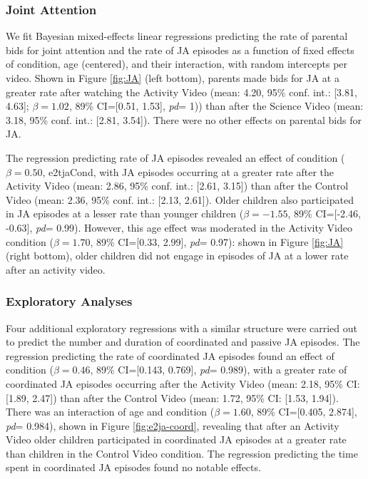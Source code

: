 \documentclass[man,floatsintext]{apa6}
\begin{document}
\hypertarget{joint-attention-1}{%
\subsubsection{Joint Attention}\label{joint-attention-1}}

We fit Bayesian mixed-effects linear regressions predicting the rate of parental bids for joint attention and the rate of JA episodes as a function of fixed effects of condition, age (centered), and their interaction, with random intercepts per video.
Shown in Figure \ref{fig:JA} (left bottom), parents made bids for JA at a greater rate after watching the Activity Video (mean: 4.20, 95\% conf. int.: {[}3.81, 4.63{]}; \(\beta=1.02\), 89\% CI={[}0.51, 1.53{]}, \emph{pd}= 1)) than after the Science Video (mean: 3.18, 95\% conf. int.: {[}2.81, 3.54{]}).
There were no other effects on parental bids for JA.

The regression predicting rate of JA episodes revealed an effect of condition (\(\beta=0.50\), e2tjaCond, with JA episodes occurring at a greater rate after the Activity Video (mean: 2.86, 95\% conf. int.: {[}2.61, 3.15{]}) than after the Control Video (mean: 2.36, 95\% conf. int.: {[}2.13, 2.61{]}).
Older children also participated in JA episodes at a lesser rate than younger children (\(\beta=-1.55\), 89\% CI={[}-2.46, -0.63{]}, \emph{pd}= 0.99).
However, this age effect was moderated in the Activity Video condition (\(\beta=1.70\), 89\% CI={[}0.33, 2.99{]}, \emph{pd}= 0.97): shown in Figure \ref{fig:JA} (right bottom), older children did not engage in episodes of JA at a lower rate after an activity video.

\hypertarget{exploratory-analyses-1}{%
\subsubsection{Exploratory Analyses}\label{exploratory-analyses-1}}

Four additional exploratory regressions with a similar structure were carried out to predict the number and duration of coordinated and passive JA episodes.
The regression predicting the rate of coordinated JA episodes found an effect of condition (\(\beta=0.46\), 89\% CI={[}0.143, 0.769{]}, \emph{pd}= 0.989), with a greater rate of coordinated JA episodes occurring after the Activity Video (mean: 2.18, 95\% CI: {[}1.89, 2.47{]}) than after the Control Video (mean: 1.72, 95\% CI: {[}1.53, 1.94{]}).
There was an interaction of age and condition (\(\beta=1.60\), 89\% CI={[}0.405, 2.874{]}, \emph{pd}= 0.984), shown in Figure \ref{fig:e2ja-coord}, revealing that after an Activity Video older children participated in coordinated JA episodes at a greater rate than children in the Control Video condition.
The regression predicting the time spent in coordinated JA episodes found no notable effects.
\end{document}
